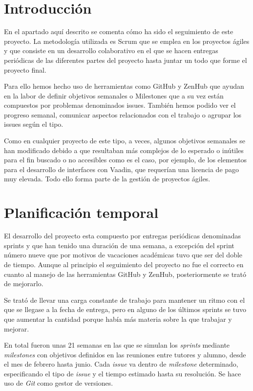 
\section{Introducción}

En el apartado aquí descrito se comenta cómo ha sido el seguimiento de este  proyecto. La metodología utilizada es Scrum que se emplea en los proyectos ágiles y que consiste en un desarrollo colaborativo en el que se hacen entregas periódicas de las diferentes partes del proyecto hasta juntar un todo que forme el proyecto final. 

Para ello hemos hecho uso de herramientas como GitHub y ZenHub que ayudan en la labor de definir objetivos semanales o Milestones que a su vez están compuestos por problemas denominados issues. También hemos podido ver el progreso semanal, comunicar aspectos relacionados con el trabajo o agrupar los issues según el tipo.

Como en cualquier proyecto de este tipo, a veces, algunos objetivos semanales se han modificado debido a que resultaban más complejos de lo esperado o inútiles para el fin buscado o no accesibles como es el caso, por ejemplo, de los elementos para el desarrollo de interfaces con Vaadin, que requerían una licencia de pago muy elevada. Todo ello forma parte de la gestión de proyectos ágiles.

\section{Planificación temporal}

El desarrollo del proyecto esta compuesto por entregas periódicas denominadas sprints y que han tenido una duración de una semana, a excepción del sprint número nueve que por motivos de vacaciones académicas tuvo que ser del doble de tiempo. Aunque al principio el seguimiento del proyecto no fue el correcto en cuanto al manejo de las herramientas GitHub  y ZenHub, posteriormente se trató de mejorarlo.

Se trató de llevar una carga constante de trabajo para mantener un ritmo con el que se llegase a la fecha de entrega, pero en alguno de los últimos sprints se tuvo que aumentar la cantidad porque había más materia sobre la que trabajar y mejorar.

En total fueron unas 21 semanas en las que se simulan los \emph{sprints} mediante \emph{milestones} con objetivos definidos en las reuniones entre tutores y alumno, desde el mes de febrero hasta junio. Cada \emph{issue} va dentro de \emph{milestone} determinado, especificando el tipo de \emph{issue} y el tiempo estimado hasta su resolución. Se hace uso de \emph{Git} como gestor de versiones. 

